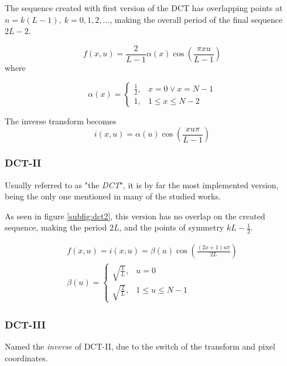 The sequence created with first version of the DCT has overlapping points at $n = k(L-1) ,\ k = 0,1,2,...$, making the overall period of the final sequence $2L-2$.

\begin{equation}
    f(x,u) = \frac{2}{L-1}\alpha(x)\cos\left(\frac{\pi xu}{L-1}\right)
\end{equation}
where

\begin{equation}
    \alpha(x)= \begin{cases}
                    \frac{1}{2}, & x=0 \lor x = N-1 \\
                    1, & 1 \leq x \leq N-2
                \end{cases}
\end{equation}

The inverse transform becomes
\begin{equation}
    i(x,u) = \alpha(u)\cos\left(\frac{xu\pi}{L-1}\right)
\end{equation}

\subsubsection{DCT-II}

Usually referred to as "the \emph{DCT}", it is by far the most implemented version, being the only one mentioned in many of the studied works.

As seen in figure \ref{subfig:dct2}, this version has no overlap on the created sequence, making the period $2L$, and the points of symmetry $kL - \frac{1}{2}$.

\begin{gather}
    f(x,u) = i(x,u) = \beta(u)\cos\left(\frac{(2x+1)u\pi }{2L}\right) \\
    \beta(u)= \begin{cases}
                    \sqrt{\frac{1}{L}}, & u=0 \\
                    \sqrt{\frac{2}{L}}, & 1 \leq u \leq N-1
                \end{cases}
\end{gather}

\subsubsection{DCT-III}

Named the \emph{inverse} of DCT-II, due to the switch of the transform and pixel coordinates.

